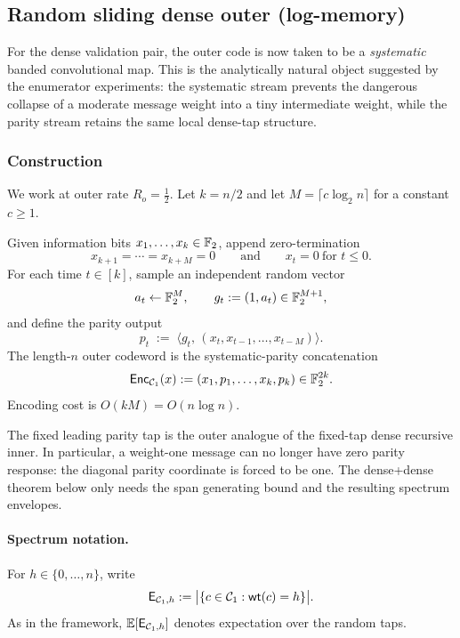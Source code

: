 \subsection{Random sliding dense outer (log-memory)}
\label{sec:outer-dense-logmem}

For the dense validation pair, the outer code is now taken to be a \emph{systematic}
banded convolutional map.
This is the analytically natural object suggested by the enumerator experiments:
the systematic stream prevents the dangerous collapse of a moderate message weight into a tiny
intermediate weight, while the parity stream retains the same local dense-tap structure.

\subsubsection{Construction}
\label{sec:outer-dense-construction}

We work at outer rate \(R_o=\tfrac12\).
Let \(k=n/2\) and let \(M=\lceil c\log_2 n\rceil\) for a constant \(c\ge 1\).

Given information bits \(x_1,\dots,x_k\in\mathbb{F}_2\), append zero-termination
\[
x_{k+1}=\cdots=x_{k+M}=0
\qquad\text{and}\qquad
x_t=0\ \text{for }t\le 0.
\]
For each time \(t\in[k]\), sample an independent random vector
\[
a_t\gets \mathbb{F}_2^M,
\qquad
g_t:=(1,a_t)\in \mathbb{F}_2^{M+1},
\]
and define the parity output
\begin{equation}
\label{eq:outer-dense-parity}
p_t \;:=\; \big\langle g_t,\,(x_t,x_{t-1},\dots,x_{t-M})\big\rangle.
\end{equation}
The length-\(n\) outer codeword is the systematic-parity concatenation
\[
\mathsf{Enc}_{{\mathcal{C}_1}}(x)
:=
(x_1,p_1,\dots,x_k,p_k)\in\mathbb{F}_2^{2k}.
\]
Encoding cost is \(O(kM)=O(n\log n)\).

The fixed leading parity tap is the outer analogue of the fixed-tap dense recursive inner. In particular, a weight-one
message can no longer have zero parity response: the diagonal parity coordinate is forced to be one.
The dense+dense theorem below only needs the span generating bound and the resulting spectrum envelopes.

\paragraph{Spectrum notation.}
For \(h\in\{0,\dots,n\}\), write
\[
\mathsf{E}_{{\mathcal{C}_1},h}
:=
\bigl|\{c\in{\mathcal{C}_1}:\mathsf{wt}(c)=h\}\bigr|.
\]
As in the framework, \(\mathbb{E}[\mathsf{E}_{{\mathcal{C}_1},h}]\) denotes expectation over the random taps.

